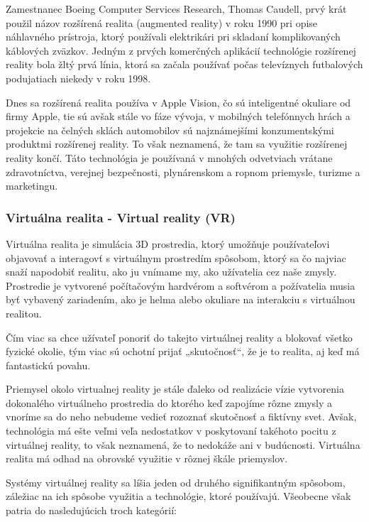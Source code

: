 Zamestnanec Boeing Computer Services Research, Thomas Caudell, prvý krát použil názov rozšírená realita (augmented reality) v roku 1990 pri opise náhlavného prístroja, ktorý používali elektrikári pri skladaní komplikovaných káblových zväzkov. Jedným z prvých komerčných aplikácií technológie rozšírenej reality bola žltý prvá línia, ktorá sa začala používať počas televíznych futbalových podujatiach niekedy v roku 1998. 

Dnes sa rozšírená realita používa v Apple Vision, čo sú inteligentné okuliare od firmy Apple, tie sú avšak stále vo fáze vývoja, v mobilných telefónnych hrách a projekcie na čelných sklách automobilov sú najznámejšími konzumentskými produktmi rozšírenej reality. To však neznamená, že tam sa využitie rozšírenej reality končí. Táto technológia je používaná v mnohých odvetviach vrátane zdravotníctva, verejnej bezpečnosti, plynárenskom a ropnom priemysle, turizme a marketingu. \cite{gillis2024ar}

\subsubsection{Virtuálna realita - Virtual reality (VR)}

Virtuálna realita je simulácia 3D prostredia, ktorý umožňuje používateľovi objavovať a interagovť s virtuálnym prostredím spôsobom, ktorý sa čo najviac snaží napodobiť realitu, ako ju vnímame my, ako užívatelia cez naše zmysly. Prostredie je vytvorené počítačovým hardvérom a softvérom a požívatelia musia byť vybavený zariadením, ako je helma alebo okuliare na interakciu s virtuálnou realitou. 

Čím viac sa chce užívateľ ponoriť do takejto virtuálnej reality a blokovať všetko fyzické okolie, tým viac sú ochotní prijať „skutočnosť“, že je to realita, aj keď má fantastickú povahu.

Priemysel okolo virtualnej reality je stále ďaleko od realizácie vízie vytvorenia dokonalého virtuálneho prostredia do ktorého keď zapojíme rôzne zmysly a  vnoríme sa do neho nebudeme vedieť rozoznať skutočnosť a fiktívny svet. Avšak, technológia má ešte veľmi veľa nedostatkov v poskytovaní takéhoto pocitu z virtuálnej reality, to však neznamená, že to nedokáže ani v budúcnosti. Virtuálna realita má odhad na obrovské využitie v rôznej škále priemyslov. 

Systémy virtuálnej reality sa líšia jeden od druhého signifikantným spôsobom, záležiac na ich spôsobe využitia a technológie, ktoré používajú. Všeobecne však patria do nasledujúcich troch kategórií: 

